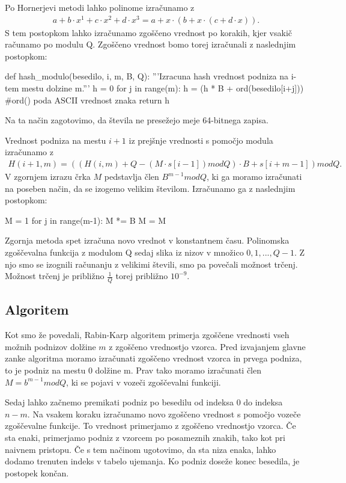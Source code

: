\documentclass[12pt]{article}
\begin{document}
Po Hornerjevi metodi lahko polinome izračunamo z
\begin{align*} 
  a + b \cdot x^{1} + c \cdot x^{2} + d \cdot x^{3} = a + x\cdot (b+ x \cdot (c + d \cdot x)).
\end{align*}
S tem postopkom lahko izračunamo zgoščeno vrednost po korakih, kjer vsakič računamo po modulu Q.
Zgoščeno vrednost bomo torej izračunali z naslednjim postopkom:
\begin{python}
  def hash_modulo(besedilo, i, m, B, Q):
    '''Izracuna hash vrednost podniza na i-tem mestu dolzine m.'''
    h = 0
    for j in range(m):
        h = (h * B + ord(besedilo[i+j])) %
        #ord() poda ASCII vrednost znaka
    return h
\end{python}
Na ta način zagotovimo, da števila ne presežejo meje 64-bitnega zapisa.

Vrednost podniza na mestu $i+1$ iz prejšnje vrednosti s pomočjo modula izračunamo z
\begin{align*}
  H(i+1, m) = ((H(i, m) + Q - (M \cdot s[i-1])modQ) \cdot B + s[i + m -1])modQ.
\end{align*}
V zgornjem izrazu črka $M$ pedstavlja člen $B^{m-1}modQ$, ki ga moramo izračunati na poseben način, da se izogemo velikim številom.
Izračunamo ga z naslednjim postopkom:
\begin{python}
  M = 1
  for j in range(m-1):
      M *= B
      M = M %
\end{python}
Zgornja metoda spet izračuna novo vrednot v konstantnem času.
Polinomska zgoščevalna funkcija z modulom Q sedaj slika iz nizov v množico ${0, 1, ..., Q-1}$. Z njo smo se izognili računanju
z velikimi števili, smo pa povečali možnost trčenj. Možnost trčenj je približno $\frac{1}{Q}$ torej približno $10^{-9}$.


\subsection{Algoritem}
Kot smo že povedali, Rabin-Karp algoritem primerja zgoščene vrednosti vseh možnih podnizov dolžine $m$ z zgoščeno vrednostjo vzorca.
Pred izvajanjem glavne zanke algoritma moramo izračunati zgoščeno vrednost vzorca in prvega podniza, to je podniz na mestu 0 dolžine m.
Prav tako moramo izračunati člen $M = b^{m-1}modQ$, ki se pojavi v vozeči zgoščevalni funkciji.

Sedaj lahko začnemo premikati podniz po besedilu od indeksa $0$ do indeksa $n-m$. Na vsakem koraku izračunamo novo zgoščeno vrednost s pomočjo
vozeče zgoščevalne funkcije. To vrednost primerjamo z zgoščeno vrednostjo vzorca. Če sta enaki, primerjamo podniz z vzorcem po posameznih znakih, tako kot pri naivnem pristopu.
Če s tem načinom ugotovimo, da sta niza enaka, lahko dodamo trenuten indeks v tabelo ujemanja. Ko podniz doseže konec besedila, je postopek končan.
\end{document}
